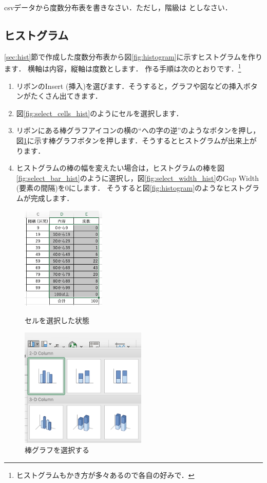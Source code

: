 csvデータから度数分布表を書きなさい．ただし，階級は    としなさい．

\subsection{ヒストグラム}

\ref{sec:hist}節で作成した度数分布表から図\ref{fig:histogram}に示すヒストグラムを作ります．
横軸は内容，縦軸は度数とします．
作る手順は次のとおりです．\footnote{ヒストグラムもかき方が多々あるので各自の好みで．}


\begin{enumerate}
    \item リボンのInsert (挿入)を選びます．そうすると，グラフや図などの挿入ボタンがたくさん出てきます．
    \item 図\ref{fig:select_cells_hist}のようにセルを選択します．
    \item リボンにある棒グラフアイコンの横の``への字の逆''のようなボタンを押し，図\ref{fig:select_barchart_hist}に示す棒グラフボタンを押します．そうするとヒストグラムが出来上がります．
    \item ヒストグラムの棒の幅を変えたい場合は，ヒストグラムの棒を図\ref{fig:select_bar_hist}のように選択し，図\ref{fig:select_width_hist}のGap Width (要素の間隔)を0にします．
    そうすると図\ref{fig:histogram}のようなヒストグラムが完成します．
\end{enumerate}


\begin{figure}[htbp]
    \begin{minipage}{0.5\hsize}
        \centering
  \includegraphics[width=4cm]{chap1/select_cells_hist.png}
  \caption{セルを選択した状態}
  \label{fig:select_cells_hist}
 \end{minipage}
 \begin{minipage}{0.5\hsize}
        \centering
  \includegraphics[width=6cm]{chap1/select_barchart_hist.png}
  \caption{棒グラフを選択する}
  \label{fig:select_barchart_hist}
 \end{minipage}
\end{figure}

